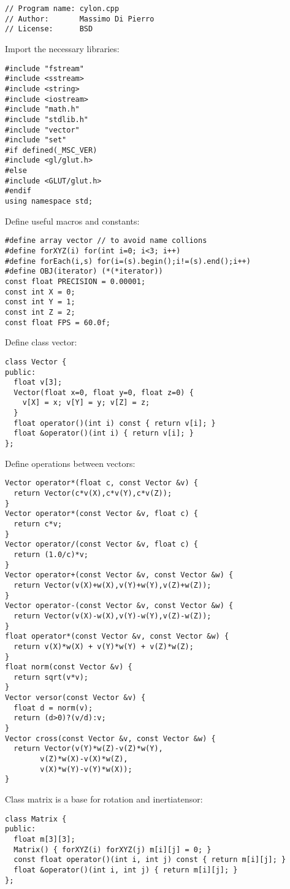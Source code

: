 \noindent
\begin{lstlisting}
// Program name: cylon.cpp         
// Author:       Massimo Di Pierro 
// License:      BSD
\end{lstlisting}
\noindent
Import the necessary libraries: \begin{lstlisting}
#include "fstream"
#include <sstream>
#include <string>
#include <iostream>
#include "math.h"
#include "stdlib.h"
#include "vector"
#include "set"
#if defined(_MSC_VER)
#include <gl/glut.h>
#else
#include <GLUT/glut.h>
#endif
using namespace std;
\end{lstlisting}
\noindent
Define useful macros and constants: \begin{lstlisting}
#define array vector // to avoid name collions
#define forXYZ(i) for(int i=0; i<3; i++)
#define forEach(i,s) for(i=(s).begin();i!=(s).end();i++)
#define OBJ(iterator) (*(*iterator))
const float PRECISION = 0.00001;
const int X = 0;
const int Y = 1;
const int Z = 2;
const float FPS = 60.0f;
\end{lstlisting}
\noindent
Define class vector: \begin{lstlisting}
class Vector {
public:
  float v[3];
  Vector(float x=0, float y=0, float z=0) {
    v[X] = x; v[Y] = y; v[Z] = z;
  }
  float operator()(int i) const { return v[i]; }
  float &operator()(int i) { return v[i]; }
};
\end{lstlisting}
\noindent
Define operations between vectors: \begin{lstlisting}
Vector operator*(float c, const Vector &v) {
  return Vector(c*v(X),c*v(Y),c*v(Z));
}
Vector operator*(const Vector &v, float c) {
  return c*v;
}
Vector operator/(const Vector &v, float c) {
  return (1.0/c)*v;
}
Vector operator+(const Vector &v, const Vector &w) {
  return Vector(v(X)+w(X),v(Y)+w(Y),v(Z)+w(Z));
}
Vector operator-(const Vector &v, const Vector &w) {
  return Vector(v(X)-w(X),v(Y)-w(Y),v(Z)-w(Z));
}
float operator*(const Vector &v, const Vector &w) {
  return v(X)*w(X) + v(Y)*w(Y) + v(Z)*w(Z);
}
float norm(const Vector &v) {
  return sqrt(v*v);
}
Vector versor(const Vector &v) {
  float d = norm(v);
  return (d>0)?(v/d):v;
}
Vector cross(const Vector &v, const Vector &w) {
  return Vector(v(Y)*w(Z)-v(Z)*w(Y),
		v(Z)*w(X)-v(X)*w(Z),
		v(X)*w(Y)-v(Y)*w(X));
}
\end{lstlisting}
\noindent
Class matrix is a base for rotation and inertiatensor: \begin{lstlisting}
class Matrix {
public:
  float m[3][3];
  Matrix() { forXYZ(i) forXYZ(j) m[i][j] = 0; }
  const float operator()(int i, int j) const { return m[i][j]; }
  float &operator()(int i, int j) { return m[i][j]; }
};
\end{lstlisting}
